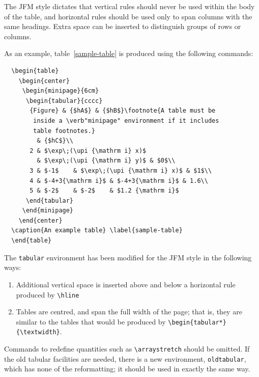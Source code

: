 The JFM style dictates that vertical rules should never be used within the 
body of the table, and horizontal rules should be used only to span 
columns with the same headings. Extra space can be inserted to distinguish
groups of rows or columns.

As an example, table~\ref{sample-table} is produced using the following
commands:

\smallskip
\begin{verbatim}
  \begin{table}
    \begin{center}
     \begin{minipage}{6cm}
      \begin{tabular}{cccc}
       {Figure} & {$hA$} & {$hB$}\footnote{A table must be 
        inside a \verb"minipage" environment if it includes 
        table footnotes.}
         & {$hC$}\\
       2 & $\exp\;(\upi {\mathrm i} x)$
         & $\exp\;(\upi {\mathrm i} y)$ & $0$\\
       3 & $-1$    & $\exp\;(\upi {\mathrm i} x)$ & $1$\\
       4 & $-4+3{\mathrm i}$ & $-4+3{\mathrm i}$ & 1.6\\
       5 & $-2$    & $-2$    & $1.2 {\mathrm i}$
      \end{tabular}
     \end{minipage}
    \end{center}
  \caption{An example table} \label{sample-table}
  \end{table}
\end{verbatim}
\smallskip

The \verb"tabular" environment
has been modified for the JFM style in the following ways:
\begin{enumerate}
  \item Additional vertical space is inserted above and below a horizontal   
        rule produced by \verb"\hline"
  \item Tables are centred, and span the full width of the page; that is,
        they are similar to the tables that would be produced by
        \verb"\begin{tabular*}{\textwidth}".
\end{enumerate}
Commands to
redefine quantities such as \verb"\arraystretch" should be omitted. If
the old tabular facilities are needed, there is a new environment,
\verb"oldtabular", which has none of the reformatting; it should be used
in exactly the same way.

